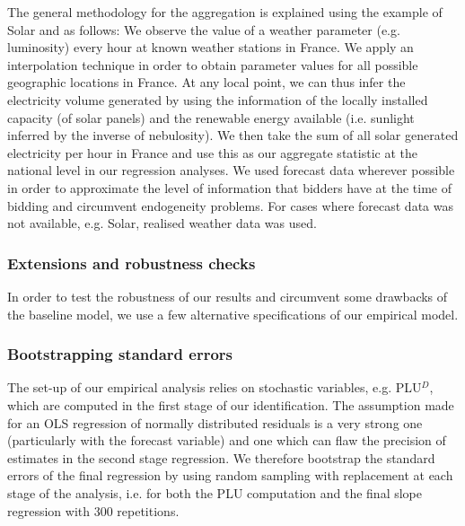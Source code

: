 The general methodology for the aggregation is explained using the example of Solar and as follows: We observe the value of a weather parameter (e.g. luminosity) every hour at known weather stations in France. 
We apply an interpolation technique in order to obtain parameter values for all possible geographic locations in France. At any local point, we can thus infer the electricity volume generated by using the information of the locally installed capacity (of solar panels) and the renewable energy available (i.e. sunlight inferred by the inverse of nebulosity). We then take the sum of all solar generated electricity per hour in France and use this as our aggregate statistic at the national level in our regression analyses. 
We used forecast data wherever possible in order to approximate the level of information that bidders have at the time of bidding and circumvent endogeneity problems. 
For cases where forecast data was not available, e.g. Solar, realised weather data was used. 


\subsubsection{Extensions and robustness checks}
In order to test the robustness of our results and circumvent some drawbacks of the baseline model, we use a few alternative specifications of our empirical model. 

%



\subsubsection{Bootstrapping standard errors}
The set-up of our empirical analysis relies on stochastic variables, e.g. PLU$^D$, which are computed in the first stage of our identification. The assumption made for an OLS regression of normally distributed residuals is a very strong one (particularly with the forecast variable) and one which can flaw the precision of estimates in the second stage regression. 
We therefore bootstrap the standard errors of the final regression by using random sampling with replacement at each stage of the analysis, i.e. for both the PLU computation and the final slope regression  with 300 repetitions. \\%

